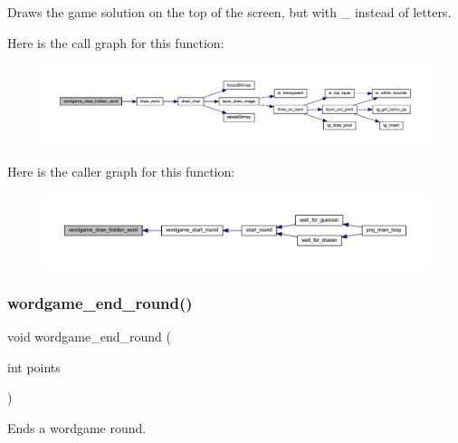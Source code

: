 Draws the game solution on the top of the screen, but with \textquotesingle{}\+\_\+\textquotesingle{} instead of letters. 

Here is the call graph for this function\+:\nopagebreak
\begin{figure}[H]
\begin{center}
\leavevmode
\includegraphics[width=350pt]{group__wordpicker_gace6e5a32a72b4f595817f2275c431401_cgraph}
\end{center}
\end{figure}
Here is the caller graph for this function\+:\nopagebreak
\begin{figure}[H]
\begin{center}
\leavevmode
\includegraphics[width=350pt]{group__wordpicker_gace6e5a32a72b4f595817f2275c431401_icgraph}
\end{center}
\end{figure}
\mbox{\label{group__wordpicker_ga0b9b141f8ba315b5f78506c4d0bdc666}} 
\subsubsection{\texorpdfstring{wordgame\+\_\+end\+\_\+round()}{wordgame\_end\_round()}}
{\footnotesize\ttfamily void wordgame\+\_\+end\+\_\+round (\begin{DoxyParamCaption}\item[{int}]{points }\end{DoxyParamCaption})}



Ends a wordgame round. 


